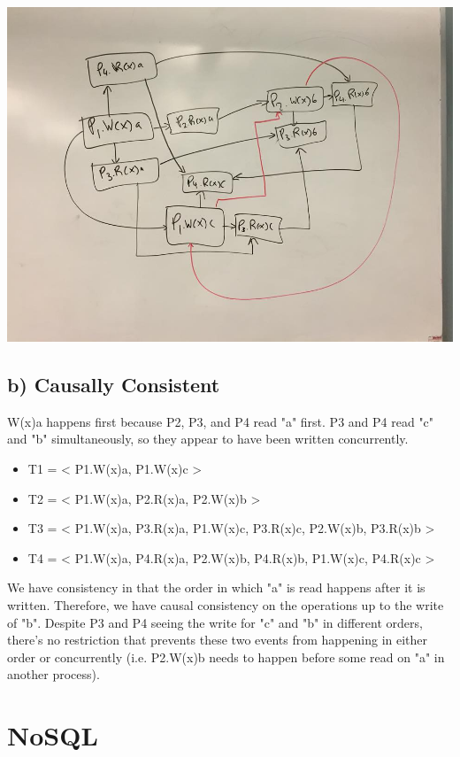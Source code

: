 \documentclass[12pt]{article}
\begin{document}
\begin{center}
\includegraphics[scale=0.25]{sequential0}
\end{center}
\subsection*{b) Causally Consistent}
W(x)a happens first because P2, P3, and P4 read "a" first. P3 and P4 read "c" and "b" simultaneously, so they appear to have been written concurrently.

\begin{itemize}
\item T1 = < P1.W(x)a, P1.W(x)c >
\item T2 = < P1.W(x)a, P2.R(x)a, P2.W(x)b >
\item T3 = < P1.W(x)a, P3.R(x)a, P1.W(x)c, P3.R(x)c, P2.W(x)b, P3.R(x)b >
\item T4 = < P1.W(x)a, P4.R(x)a, P2.W(x)b, P4.R(x)b, P1.W(x)c, P4.R(x)c >
\end{itemize}

We have consistency in that the order in which "a" is read happens after it is written. Therefore, we have causal consistency on the operations up to the write of "b".
Despite P3 and P4 seeing the write for "c" and "b" in different orders, there's no restriction that prevents these two events from happening in either order or concurrently (i.e. P2.W(x)b needs to happen before some read on "a" in another process).

\section{NoSQL}
\end{document}
